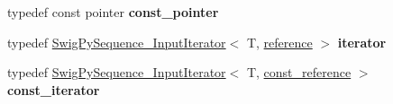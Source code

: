 \begin{DoxyCompactItemize}
typedef const pointer {\bfseries const\+\_\+pointer}
\item 
\mbox{\label{structswig_1_1SwigPySequence__Cont_abcd331d0657a109f34c0fd84c5be87dd}} 
typedef \mbox{\hyperlink{structswig_1_1SwigPySequence__InputIterator}{Swig\+Py\+Sequence\+\_\+\+Input\+Iterator}}$<$ T, \mbox{\hyperlink{structswig_1_1SwigPySequence__Ref}{reference}} $>$ {\bfseries iterator}
\item 
\mbox{\label{structswig_1_1SwigPySequence__Cont_a708a6b3790b68aa53bd79d27a2c16b89}} 
typedef \mbox{\hyperlink{structswig_1_1SwigPySequence__InputIterator}{Swig\+Py\+Sequence\+\_\+\+Input\+Iterator}}$<$ T, \mbox{\hyperlink{structswig_1_1SwigPySequence__Ref}{const\+\_\+reference}} $>$ {\bfseries const\+\_\+iterator}
\end{DoxyCompactItemize}
